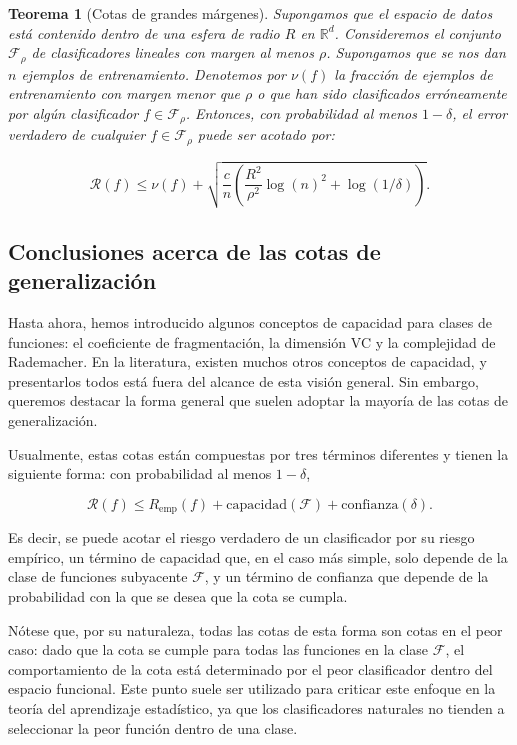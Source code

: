 \documentclass{report}
\newtheorem{thm}{Teorema}[subsection]
\begin{document}
\begin{thm}[Cotas de grandes márgenes]

Supongamos que el espacio de datos está contenido dentro de una esfera de radio \(R\) en 
\(\mathbb{R}^d\). Consideremos el conjunto \(\mathcal{F}_\rho\) de clasificadores lineales con 
margen al menos \(\rho\). Supongamos que se nos dan \(n\) ejemplos de entrenamiento. Denotemos 
por \(\nu(f)\) la fracción de ejemplos de entrenamiento con margen menor que \(\rho\) o que han 
sido clasificados erróneamente por algún clasificador \(f \in \mathcal{F}_\rho\). Entonces, con 
probabilidad al menos \(1 - \delta\), el error verdadero de cualquier \(f \in \mathcal{F}_\rho\) 
puede ser acotado por:

\[
\mathcal{R}(f) \leq \nu(f) + \sqrt{\frac{c}{n} \left( \frac{R^2}{\rho^2} \log(n)^2 + \log(1/\delta) \right)} .
\]
\end{thm}

\subsection{Conclusiones acerca de las cotas de generalización}

Hasta ahora, hemos introducido algunos conceptos de capacidad para clases de funciones: el 
coeficiente de fragmentación, la dimensión VC y la complejidad de Rademacher. En la literatura, 
existen muchos otros conceptos de capacidad, y presentarlos todos está fuera del alcance de esta 
visión general. Sin embargo, queremos destacar la forma general que suelen adoptar la mayoría 
de las cotas de generalización.\newline

Usualmente, estas cotas están compuestas por tres términos diferentes y tienen la siguiente forma: 
con probabilidad al menos \(1 - \delta\),

\[
\mathcal{R}(f) \leq R_{\text{emp}}(f) + \text{capacidad}(\mathcal{F}) + \text{confianza}(\delta).
\]

Es decir, se puede acotar el riesgo verdadero de un clasificador por su riesgo empírico, un término 
de capacidad que, en el caso más simple, solo depende de la clase de funciones subyacente 
\(\mathcal{F}\), y un término de confianza que depende de la probabilidad con la que se desea que 
la cota se cumpla.\newline

Nótese que, por su naturaleza, todas las cotas de esta forma son cotas en el peor caso: dado que 
la cota se cumple para todas las funciones en la clase \(\mathcal{F}\), el comportamiento de la cota 
está determinado por el peor clasificador dentro del espacio funcional. Este punto suele ser 
utilizado para criticar este enfoque en la teoría del aprendizaje estadístico, ya que los clasificadores 
naturales no tienden a seleccionar la peor función dentro de una clase.\newline
\end{document}
